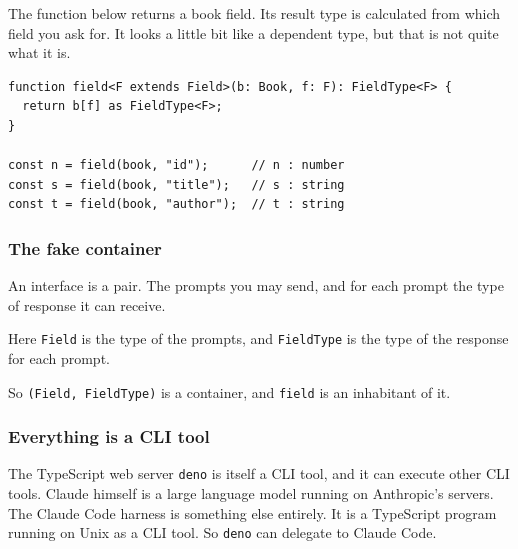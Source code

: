\documentclass[aspectratio=169,12pt]{beamer}
\begin{document}
\begin{frame}[fragile]
\vfill
\begin{center}
\begin{minipage}{0.92\textwidth}
\raggedright
\large

The function below returns a book field. Its result type is calculated from which field you
ask for. It looks a little bit
like a dependent type, but that is not quite what it is.

\medskip

\begin{lstlisting}[basicstyle=\ttfamily\small,morekeywords={function,return,const,as,extends}]
function field<F extends Field>(b: Book, f: F): FieldType<F> {
  return b[f] as FieldType<F>;
}

const n = field(book, "id");      // n : number
const s = field(book, "title");   // s : string
const t = field(book, "author");  // t : string
\end{lstlisting}

\end{minipage}
\end{center}
\vfill
\end{frame}

\begin{frame}
\frametitle{The fake container}
\vfill
\begin{center}
\begin{minipage}{0.92\textwidth}
\raggedright
\large

An interface is a pair. The prompts you may send, and for each prompt the type of response it can
receive.

\medskip

Here \texttt{Field} is the type of the prompts, and \texttt{FieldType} is the type of the response
for each prompt.

\medskip

So \texttt{(Field, FieldType)} is a container, and \texttt{field} is an inhabitant of it.

\end{minipage}
\end{center}
\vfill
\end{frame}

\begin{frame}
\frametitle{Everything is a CLI tool}
\vfill
\begin{center}
\begin{minipage}{0.92\textwidth}
\raggedright
\large

The TypeScript web server \texttt{deno} is itself a CLI tool, and it can execute other CLI tools.
Claude himself is a large language model running on Anthropic's servers. The Claude Code harness
is something else entirely. It is a TypeScript program running on Unix as a CLI tool. So
\texttt{deno} can delegate to Claude Code.

\end{minipage}
\end{center}
\vfill
\end{frame}
\end{document}
